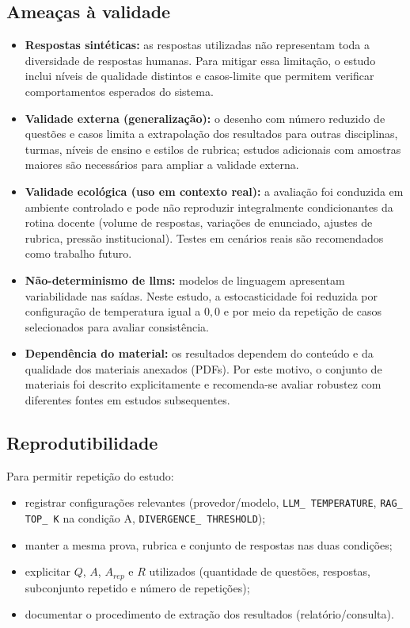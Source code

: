 \subsection{Ameaças à validade}
\begin{itemize}
    \item \textbf{Respostas sintéticas:} as respostas utilizadas não representam toda a diversidade de respostas humanas. Para mitigar essa limitação, o estudo inclui níveis de qualidade distintos e casos-limite que permitem verificar comportamentos esperados do sistema.
    \item \textbf{Validade externa (generalização):} o desenho com número reduzido de questões e casos limita a extrapolação dos resultados para outras disciplinas, turmas, níveis de ensino e estilos de rubrica; estudos adicionais com amostras maiores são necessários para ampliar a validade externa.
    \item \textbf{Validade ecológica (uso em contexto real):} a avaliação foi conduzida em ambiente controlado e pode não reproduzir integralmente condicionantes da rotina docente (volume de respostas, variações de enunciado, ajustes de rubrica, pressão institucional). Testes em cenários reais são recomendados como trabalho futuro.
    \item \textbf{Não-determinismo de \gls{llm}s:} modelos de linguagem apresentam variabilidade nas saídas. Neste estudo, a estocasticidade foi reduzida por configuração de temperatura igual a $0{,}0$ e por meio da repetição de casos selecionados para avaliar consistência.
    \item \textbf{Dependência do material:} os resultados dependem do conteúdo e da qualidade dos materiais anexados (PDFs). Por este motivo, o conjunto de materiais foi descrito explicitamente e recomenda-se avaliar robustez com diferentes fontes em estudos subsequentes.
\end{itemize}

\subsection{Reprodutibilidade}
Para permitir repetição do estudo:

\begin{itemize}
    \item registrar configurações relevantes (provedor/modelo, \texttt{LLM\_\allowbreak%
    TEMPERATURE}, \texttt{RAG\_\allowbreak%
    TOP\_\allowbreak%
    K} na condição A, \texttt{DIVERGENCE\_\allowbreak%
    THRESHOLD});
    \item manter a mesma prova, rubrica e conjunto de respostas nas duas condições;
    \item explicitar \(Q\), \(A\), \(A_{rep}\) e \(R\) utilizados (quantidade de questões, respostas, subconjunto repetido e número de repetições);
    \item documentar o procedimento de extração dos resultados (relatório/consulta).
\end{itemize}
